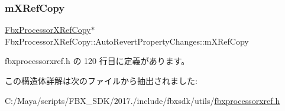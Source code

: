 \subsubsection{\texorpdfstring{m\+X\+Ref\+Copy}{mXRefCopy}}
{\footnotesize\ttfamily \hyperlink{class_fbx_processor_x_ref_copy}{Fbx\+Processor\+X\+Ref\+Copy}$\ast$ Fbx\+Processor\+X\+Ref\+Copy\+::\+Auto\+Revert\+Property\+Changes\+::m\+X\+Ref\+Copy}



 fbxprocessorxref.\+h の 120 行目に定義があります。



この構造体詳解は次のファイルから抽出されました\+:\begin{DoxyCompactItemize}
\item 
C\+:/\+Maya/scripts/\+F\+B\+X\+\_\+\+S\+D\+K/2017./include/fbxsdk/utils/\hyperlink{fbxprocessorxref_8h}{fbxprocessorxref.\+h}\end{DoxyCompactItemize}
